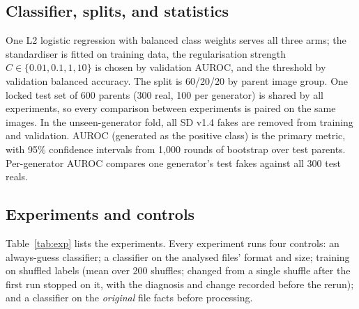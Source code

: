\documentclass[conference]{IEEEtran}
\begin{document}
\subsection{Classifier, splits, and statistics}
One L2 logistic regression with balanced class weights serves all three arms; the standardiser is fitted on training data, the regularisation strength $C\in\{0.01,0.1,1,10\}$ is chosen by validation AUROC, and the threshold by validation balanced accuracy. The split is 60/20/20 by parent image group. One locked test set of 600 parents (300 real, 100 per generator) is shared by all experiments, so every comparison between experiments is paired on the same images. In the unseen-generator fold, all SD v1.4 fakes are removed from training and validation. AUROC (generated as the positive class) is the primary metric, with 95\% confidence intervals from 1,000 rounds of bootstrap over test parents. Per-generator AUROC compares one generator's test fakes against all 300 test reals.

\subsection{Experiments and controls}
Table~\ref{tab:exp} lists the experiments. Every experiment runs four controls: an always-guess classifier; a classifier on the analysed files' format and size; training on shuffled labels (mean over 200 shuffles; changed from a single shuffle after the first run stopped on it, with the diagnosis and change recorded before the rerun); and a classifier on the \emph{original} file facts before processing.

\begin{table}[t]
\centering
\caption{Experiments. E1--E5 were fixed in advance; R is a post-hoc diagnostic.}
\label{tab:exp}
\footnotesize
\setlength{\tabcolsep}{2.5pt}
\end{table}
\end{document}
